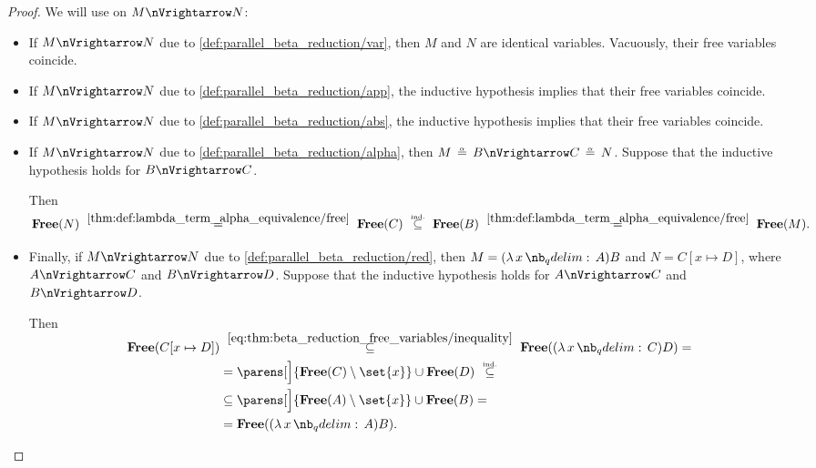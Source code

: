 \begin{proof}
   We will use  on \( M \pred N \):
  \begin{itemize}
    \item If \( M \pred N \) due to \ref{def:parallel_beta_reduction/var}, then \( M \) and \( N \) are identical variables. Vacuously, their free variables coincide.

    \item If \( M \pred N \) due to \ref{def:parallel_beta_reduction/app}, the inductive hypothesis implies that their free variables coincide.

    \item If \( M \pred N \) due to \ref{def:parallel_beta_reduction/abs}, the inductive hypothesis implies that their free variables coincide.

    \item If \( M \pred N \) due to \ref{def:parallel_beta_reduction/alpha}, then \( M \aequiv B \pred C \aequiv N \). Suppose that the inductive hypothesis holds for \( B \pred C \).

    Then
    \begin{equation*}
      \op*{Free}(N)
      \reloset {\ref{thm:def:lambda_term_alpha_equivalence/free}} =
      \op*{Free}(C)
      \reloset {\T{ind.}} \subseteq
      \op*{Free}(B)
      \reloset {\ref{thm:def:lambda_term_alpha_equivalence/free}} =
      \op*{Free}(M).
    \end{equation*}

    \item Finally, if \( M \pred N \) due to \ref{def:parallel_beta_reduction/red}, then \( M = (\qabs x A)B \) and \( N = C[x \mapsto D] \), where \( A \pred C \) and \( B \pred D \). Suppose that the inductive hypothesis holds for \( A \pred C \) and \( B \pred D \).

    Then
    \begin{align*}
      \op*{Free}(C[x \mapsto D])
      &\reloset {\eqref{eq:thm:beta_reduction_free_variables/inequality}} \subseteq
      \op*{Free}((\qabs x C) D)
      = \\ &=
      \parens[\Big]{ \op*{Free}(C) \setminus \set{ x } } \cup \op*{Free}(D)
      \reloset {\T{ind.}} \subseteq \\ &\subseteq
      \parens[\Big]{ \op*{Free}(A) \setminus \set{ x } } \cup \op*{Free}(B)
      = \\ &=
      \op*{Free}((\qabs x A) B).
    \end{align*}
  \end{itemize}
\end{proof}

